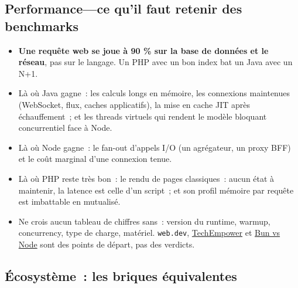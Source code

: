 \documentclass[12pt,a4paper,twoside,openright]{book}
\newcommand{\link}[2]{\href{#2}{#1}}
\begin{document}
\subsection{Performance---ce qu'il faut retenir des benchmarks}

\begin{itemize}
  \item \textbf{Une requ\^ete web se joue \`a 90 \% sur la base de donn\'ees et le r\'eseau}, pas sur le langage.
        Un PHP avec un bon index bat un Java avec un N+1.
  \item L\`a o\`u Java gagne~: les calculs longs en m\'emoire, les connexions maintenues (WebSocket,
        flux, caches applicatifs), la mise en cache JIT apr\`es \'echauffement~; et les threads
        virtuels qui rendent le mod\`ele bloquant concurrentiel face \`a Node.
  \item L\`a o\`u Node gagne~: le fan-out d'appels I/O (un agr\'egateur, un proxy BFF) et le co\^ut
        marginal d'une connexion tenue.
  \item L\`a o\`u PHP reste tr\`es bon~: le rendu de pages classiques~: aucun \'etat \`a maintenir, la
        latence est celle d'un script~; et son profil m\'emoire par requ\^ete est imbattable en
        mutualis\'e.
  \item Ne crois aucun tableau de chiffres sans~: version du runtime, warmup, concurrency, type de
        charge, mat\'eriel. \verb|web.dev|, \link{TechEmpower}{https://www.techempowerbenchmarks.org/}
        et \link{Bun vs Node}{https://benchmark.js.org/} sont des points de d\'epart, pas des verdicts.
\end{itemize}

\subsection{\'Ecosyst\`eme~: les briques \'equivalentes}
\end{document}
